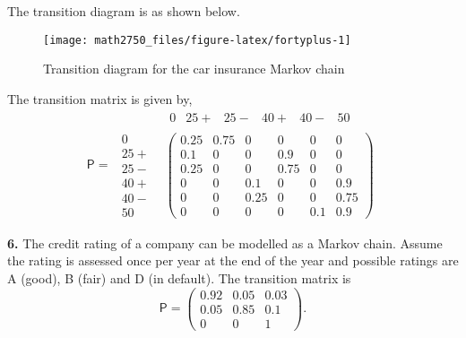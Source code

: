 \documentclass[
  a4paper,
]{article}
\theoremstyle{definition}
\theoremstyle{definition}
\theoremstyle{definition}
\theoremstyle{remark}
\begin{document}
\begin{myanswers}

The transition diagram is as shown below.

\begin{figure}

{\centering \texttt{[image: math2750\_files/figure-latex/fortyplus-1]} 

}

\caption{Transition diagram for the car insurance Markov chain}\label{fig:fortyplus}
\end{figure}

The transition matrix is given by,
\[ \mathsf P = 
    \begin{matrix}
    & \begin{matrix} 
        0 & 25+ & 25- & 40+ & 40- & 50
      \end{matrix} \\
    \begin{matrix}
      0 \\ 25+ \\ 25- \\ 40+ \\ 40- \\ 50
    \end{matrix}
    &
    \begin{pmatrix}
    0.25 & 0.75 & 0    & 0    & 0   & 0    \\
      0.1  & 0    & 0    & 0.9  & 0   & 0    \\
      0.25 & 0    & 0    & 0.75 & 0   & 0    \\
      0    & 0    & 0.1  & 0    & 0   & 0.9  \\
      0    & 0    & 0.25 & 0    & 0   & 0.75 \\
      0    & 0    & 0    & 0    & 0.1 & 0.9 
    \end{pmatrix}
    \end{matrix}
    \]

\end{myanswers}

\textbf{6.} The credit rating of a company can be modelled as a Markov chain. Assume the rating is assessed once per year at the end of the year and possible ratings are A (good), B (fair) and D (in default). The transition matrix is
\[\mathsf P=\begin{pmatrix} 0.92&0.05&0.03\\
0.05&0.85&0.1\\
0&0&1 \end{pmatrix} . \]
\end{document}
